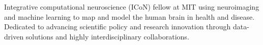 

\begin{cvparagraph}

Integrative computational neuroscience (ICoN) fellow at MIT using neuroimaging and machine learning to map and model the human brain in health and disease. Dedicated to advancing scientific policy and research innovation through data-driven solutions and highly interdisciplinary collaborations. 

\end{cvparagraph}
